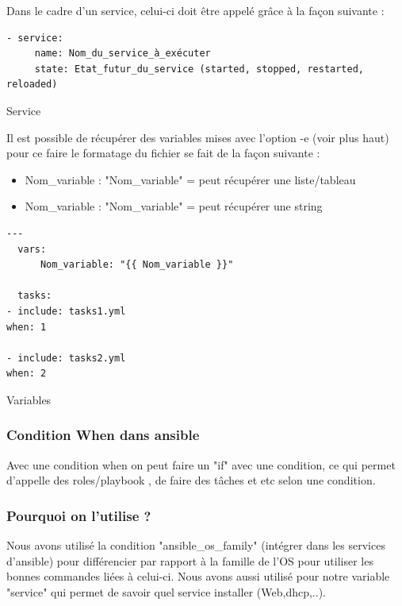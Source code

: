 \documentclass[a4paper, 12pt]{article}
\newenvironment{code}{\captionsetup{type=listing}}{}
\begin{document}
Dans le cadre d'un service, celui-ci doit être appelé grâce à la façon suivante :
\begin{code}
    \begin{verbatim}
- service:
     name: Nom_du_service_à_exécuter
     state: Etat_futur_du_service (started, stopped, restarted, reloaded)
    \end{verbatim}
    \caption{Service}
    \label{Service}
\end{code}
\bigbreak
\bigbreak
Il est possible de récupérer des variables mises avec l'option -e (voir plus haut) pour ce faire le formatage du fichier se fait de la façon suivante :
\begin{itemize}
    \item Nom\_variable : "Nom\_variable" = peut récupérer une liste/tableau
    \item Nom\_variable : "Nom\_variable" = peut récupérer une string
\end{itemize}
\begin{code}
    \begin{verbatim}
---
  vars:
      Nom_variable: "{{ Nom_variable }}"

  tasks:
- include: tasks1.yml
when: 1

- include: tasks2.yml
when: 2
    \end{verbatim}
    \caption{Variables}
    \label{Variables}
\end{code}
\bigbreak

\subsubsection{Condition When dans ansible}
Avec une condition when on peut faire un "if" avec une condition, ce qui permet d'appelle des roles/playbook ,
de faire des tâches et etc selon une condition.

\subsubsection{Pourquoi on l'utilise ?}
Nous avons utilisé la condition "ansible\_os\_family" (intégrer dans les services d'ansible) pour différencier par
rapport à la famille de l'OS pour utiliser les bonnes commandes liées à celui-ci. Nous avons aussi utilisé pour
notre variable "service" qui permet de savoir quel service installer (Web,dhcp,..).
\end{document}
